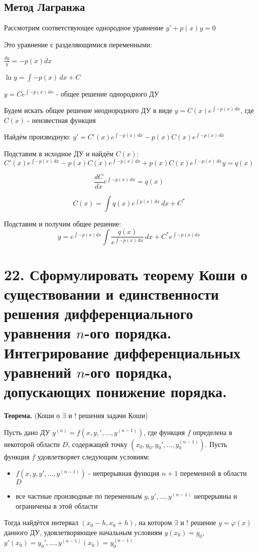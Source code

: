 \documentclass[11pt]{article}
\begin{document}
\subsection*{Метод Лагранжа}
\par Рассмотрим соответствующее однородное уравнение $y' + p(x)y = 0$
\par Это уравнение с разделяющимися переменными:
\par $\frac{dy}{y} = -p(x)dx$
\par $\ln y = \int -p(x) \, dx + C$
\par $y = Ce^{\int -p(x) \, dx}$ - общее решение однородного ДУ
\par Будем искать общее решение неоднородного ДУ в виде $y = C(x)e^{\int -p(x) \, dx}$, где $C(x)$ - неизвестная функция
\par Найдём производную: $y' = C'(x)e^{\int -p(x) \, dx} - p(x)C(x)e^{\int -p(x) \, dx}$
\par Подставим в исходное ДУ и найдём $C(x)$: $$C'(x)e^{\int -p(x) \, dx} - p(x)C(x)e^{\int -p(x) \, dx} + p(x)C(x)e^{\int -p(x) \, dx}y = q(x)$$
\par $$\frac{dC}{dx}e^{\int -p(x) \, dx} = q(x)$$
\par $$C(x) = \int q(x)e^{\int p(x) \, dx } \, dx + C^*$$
\par Подставим и получим общее решение:$$y = e^{\int -p(x)dx}\int \frac{q(x)}{e^{\int -p(x) \, dx}} \, dx + C^*e^{\int -p(x)dx}$$

\section*{22. Сформулировать теорему Коши о существовании и единственности решения дифференциального уравнения $n$-ого порядка. Интегрирование дифференциальных уравнений $n$-ого порядка, допускающих понижение порядка.}
\par\textbf{Теорема.} (Коши о $\exists$ и $!$ решения задачи Коши)
\par Пусть дано ДУ $y^{(n)} = f(x, y, ', \dots, y^{(n-1)})$, где функция $f$ определена в некоторой области $D$, содержащей точку $(x_{0}, y_{0}, y_{0}', \dots, y_{0}^{(n-1)})$. Пусть функция $f$ удовлетворяет следующим условиям:
\begin{itemize}
    \item $f(x, y, y', \dots, y^{(n-1)})$ - непрерывная функция $n+1$ переменной в области $D$
    \item все частные производные по переменным $y, y', \dots, y^{(n-1)}$ непрерывны и ограничены в этой области
\end{itemize}
\par Тогда найдётся интервал $(x_{0}-h, x_{0}+h)$, на котором $\exists$ и $!$ решение $y = \varphi(x)$ данного ДУ, удовлетворяющее начальным условиям $y(x_{0}) = y_{0}$, $y'(x_{0}) = y_{0}', \dots, y^{(n-1)}(x_{0}) = y_{0}^{(n-1)}$
\end{document}
